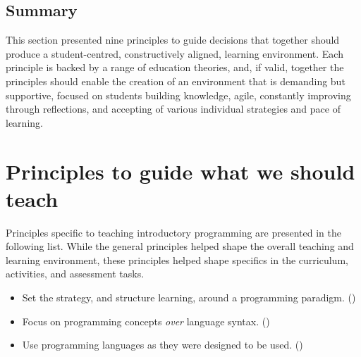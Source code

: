 



\subsection{Summary} %
\label{ssub:summary_of_principles_on_how_to_teach}

This section presented nine principles to guide decisions that together should produce a student-centred, constructively aligned, learning environment. Each principle is backed by a range of education theories, and, if valid, together the principles should enable the creation of an environment that is demanding but supportive, focused on students building knowledge, agile, constantly improving through reflections, and accepting of various individual strategies and pace of learning.










\clearpage
\section{Principles to guide what we should teach} %
\label{sec:principles_to_guide_what_we_should_cover}

Principles specific to teaching introductory programming are presented in the following list. While the general principles helped shape the overall teaching and learning environment, these principles helped shape specifics in the curriculum, activities, and assessment tasks.
\begin{itemize}[noitemsep,nolistsep]
	\item Set the strategy, and structure learning, around a programming paradigm. ()
	\item Focus on programming concepts \emph{over} language syntax. ()
	\item Use programming languages as they were designed to be used. ()
\end{itemize}


